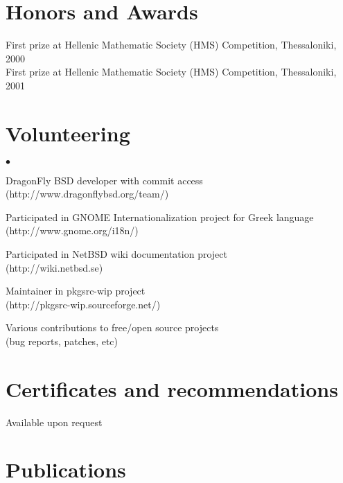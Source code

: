 \documentclass[margin,line]{res}
\newenvironment{list2}{
  \begin{list}{$\bullet$}{%
      \setlength{\itemsep}{0in}
      \setlength{\parsep}{0in} \setlength{\parskip}{0in}
      \setlength{\topsep}{0in} \setlength{\partopsep}{0in}
      \setlength{\leftmargin}{0.2in}}}{\end{list}}
\begin{document}
\begin{resume}
\section{\sc Honors and Awards}
First prize at Hellenic Mathematic Society (HMS) Competition, Thessaloniki, 2000\\
First prize at Hellenic Mathematic Society (HMS) Competition, Thessaloniki, 2001

\section{\sc Volunteering}
\begin{list2}
\item DragonFly BSD developer with commit access\\(http://www.dragonflybsd.org/team/)
\item Participated in GNOME Internationalization project for Greek language\\(http://www.gnome.org/i18n/)
\item Participated in NetBSD wiki documentation project\\(http://wiki.netbsd.se)
\item Maintainer in pkgsrc-wip project\\(http://pkgsrc-wip.sourceforge.net/)
\item Various contributions to free/open source projects\\(bug reports, patches, etc)
\end{list2}

\section{\sc Certificates and recommendations}
Available upon request

\section{\sc Publications}
\renewcommand\refname{}
\nocite{*}


\end{resume}
\end{document}
